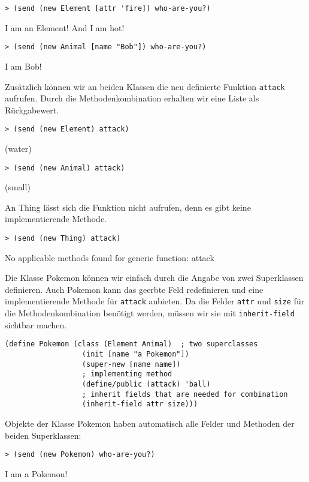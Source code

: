 \begin{lstlisting}
> (send (new Element [attr 'fire]) who-are-you?)
\end{lstlisting}
{\routput {\qq}I am an Element! And I am hot!\qq}

\begin{lstlisting}
> (send (new Animal [name "Bob"]) who-are-you?)
\end{lstlisting}
{\routput {\qq}I am Bob!\qq}

Zusätzlich können wir an beiden Klassen die neu definierte Funktion \texttt{attack} aufrufen. Durch die Methodenkombination erhalten wir eine Liste als Rückgabewert.

\begin{lstlisting}
> (send (new Element) attack)
\end{lstlisting}
{\rsymbol (water)}

\begin{lstlisting}
> (send (new Animal) attack)
\end{lstlisting}
{\rsymbol (small)}

An Thing lässt sich die Funktion nicht aufrufen, denn es gibt keine implementierende Methode.

\begin{lstlisting}
> (send (new Thing) attack)
\end{lstlisting}
{\rerror No applicable methods found for generic function: attack}

Die Klasse Pokemon können wir einfach durch die Angabe von zwei Superklassen definieren. Auch Pokemon kann das geerbte Feld redefinieren und eine implementierende Methode für \texttt{attack} anbieten. Da die Felder \texttt{attr} und \texttt{size} für die Methodenkombination benötigt werden, müssen wir sie mit \texttt{inherit-field} sichtbar machen.

\begin{lstlisting}
(define Pokemon (class (Element Animal)  ; two superclasses
                  (init [name "a Pokemon"])
                  (super-new [name name])
                  ; implementing method
                  (define/public (attack) 'ball)
                  ; inherit fields that are needed for combination
                  (inherit-field attr size)))
\end{lstlisting}

Objekte der Klasse Pokemon haben automatisch alle Felder und Methoden der beiden Superklassen:

\begin{lstlisting}
> (send (new Pokemon) who-are-you?)
\end{lstlisting}
{\routput {\qq}I am a Pokemon!\qq}


